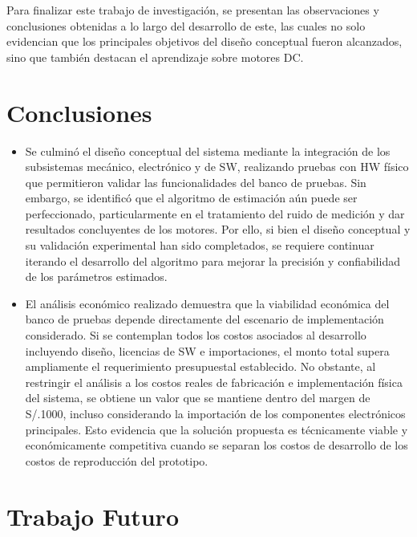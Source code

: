 \label{ch:CH09}
\noindent
Para finalizar este trabajo de investigación, se presentan las observaciones y conclusiones obtenidas a lo largo del desarrollo de este, las cuales no solo evidencian que los principales objetivos del diseño conceptual fueron alcanzados, sino que también destacan el aprendizaje sobre motores \ac{DC}.
\section*{Conclusiones}
\begin{itemize}

\item Se culminó el diseño conceptual del sistema mediante la integración de los subsistemas mecánico, electrónico y de \ac{SW}, realizando pruebas con \ac{HW} físico que permitieron validar las funcionalidades del banco de pruebas. Sin embargo, se identificó que el algoritmo de estimación aún puede ser perfeccionado, particularmente en el tratamiento del ruido de medición y dar resultados concluyentes de los motores. Por ello, si bien el diseño conceptual y su validación experimental han sido completados, se requiere continuar iterando el desarrollo del algoritmo para mejorar la precisión y confiabilidad de los parámetros estimados.

\item El análisis económico realizado demuestra que la viabilidad económica del banco de pruebas depende directamente del escenario de implementación considerado. Si se contemplan todos los costos asociados al desarrollo incluyendo diseño, licencias de \ac{SW} e importaciones, el monto total supera ampliamente el requerimiento presupuestal establecido. No obstante, al restringir el análisis a los costos reales de fabricación e implementación física del sistema, se obtiene un valor que se mantiene dentro del margen de S/.1000, incluso considerando la importación de los componentes electrónicos principales. Esto evidencia que la solución propuesta es técnicamente viable y económicamente competitiva cuando se separan los costos de desarrollo de los costos de reproducción del prototipo.

\end{itemize}
\section*{Trabajo Futuro}

